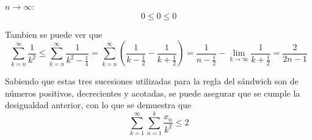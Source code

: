 \documentclass[../../main.tex]{subfiles}
\begin{document}
  $n \to \infty$:
  $$
  0 \leq 0 \leq 0
  $$

  Tambien se puede ver que
  $$
  \sum_{k = n}^\infty \frac{1}{k^2} \leq \sum_{k = n}^\infty \frac{1}{k^2 - \frac{1}{4}} =
  \sum_{k = n}^\infty \left(\frac{1}{k - \frac{1}{2}} - \frac{1}{k + \frac{1}{2}}\right) =
  \frac{1}{n - \frac{1}{2}} - \lim_{k \to \infty} \frac{1}{k + \frac{1}{2}} =
  \frac{2}{2n - 1}
  $$

  Sabiendo que estas tres sucesiones utilizadas para la regla del sándwich son de números positivos, decrecientes y acotadas, se puede asegurar que se cumple la desigualdad anterior, con lo que se demuestra que
  $$
  \sum_{k = 1}^\infty \sum_{n = 1}^k \frac{x_n}{k^2} \leq 2
  $$
\end{document}
